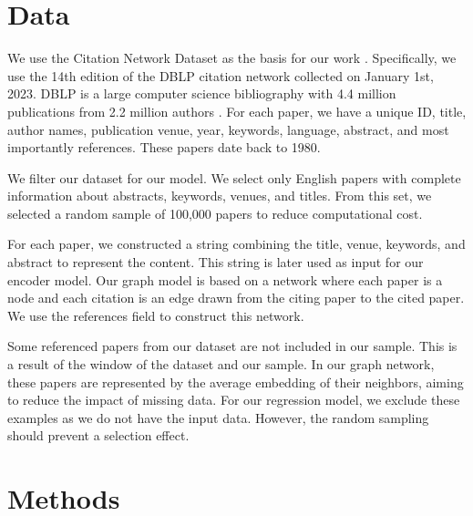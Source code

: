 \documentclass[10pt,twocolumn,letterpaper]{article}
\begin{document}
\section{Data}

We use the Citation Network Dataset as the basis for our work \cite{tang2008arnetminer}. Specifically, we use the 14th edition of the DBLP citation network collected on January 1st, 2023. DBLP is a large computer science bibliography with 4.4 million publications from 2.2 million authors \cite{ley2002dblp}. 
For each paper, we have a unique ID, title, author names, publication venue, year, keywords, language, abstract, and most importantly references. These papers date back to 1980.

\begin{table}
   
\end{table}

We filter our dataset for our model. We select only English papers with complete information about abstracts, keywords, venues, and titles. From this set, we selected a random sample of 100,000 papers to reduce computational cost.

For each paper, we constructed a string combining the title, venue, keywords, and abstract to represent the content. This string is later used as input for our encoder model. Our graph model is based on a network where each paper is a node and each citation is an edge drawn from the citing paper to the cited paper. We use the references field to construct this network. 

Some referenced papers from our dataset are not included in our sample. This is a result of the window of the dataset and our sample.
In our graph network, these papers are represented by the average embedding of their neighbors, aiming to reduce the impact of missing data. 
For our regression model, we exclude these examples as we do not have the input data.
However, the random sampling should prevent a selection effect.

\section{Methods}

\end{document}
